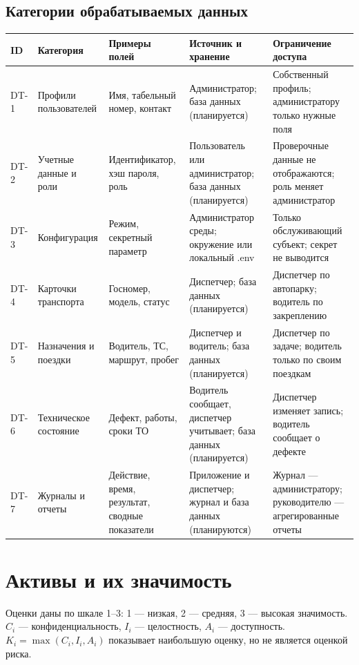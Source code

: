 \documentclass[12pt,a4paper]{article}
\begin{document}
\subsection{Категории обрабатываемых данных}
\small
\begin{longtable}{p{0.8cm}p{2.7cm}p{3.5cm}p{3cm}p{4.2cm}}
\toprule ID & Категория & Примеры полей & Источник и хранение & Ограничение доступа \\
\midrule\endhead
DT-1 & Профили пользователей & Имя, табельный номер, контакт & Администратор; база данных (планируется) & Собственный профиль; администратору только нужные поля \\
DT-2 & Учетные данные и роли & Идентификатор, хэш пароля, роль & Пользователь или администратор; база данных (планируется) & Проверочные данные не отображаются; роль меняет администратор \\
DT-3 & Конфигурация & Режим, секретный параметр & Администратор среды; окружение или локальный .env & Только обслуживающий субъект; секрет не выводится \\
DT-4 & Карточки транспорта & Госномер, модель, статус & Диспетчер; база данных (планируется) & Диспетчер по автопарку; водитель по закреплению \\
DT-5 & Назначения и поездки & Водитель, ТС, маршрут, пробег & Диспетчер и водитель; база данных (планируется) & Диспетчер по задаче; водитель только по своим поездкам \\
DT-6 & Техническое состояние & Дефект, работы, сроки ТО & Водитель сообщает, диспетчер учитывает; база данных (планируется) & Диспетчер изменяет запись; водитель сообщает о дефекте \\
DT-7 & Журналы и отчеты & Действие, время, результат, сводные показатели & Приложение и диспетчер; журнал и база данных (планируются) & Журнал — администратору; руководителю — агрегированные отчеты \\
\bottomrule
\end{longtable}
\normalsize

\section{Активы и их значимость}
Оценки даны по шкале 1--3: 1 — низкая, 2 — средняя, 3 — высокая значимость. $C_i$ — конфиденциальность, $I_i$ — целостность, $A_i$ — доступность. $K_i=\max(C_i,I_i,A_i)$ показывает наибольшую оценку, но не является оценкой риска.
\end{document}
